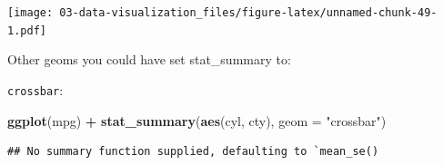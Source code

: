 \documentclass[]{book}
\newenvironment{Shaded}{\begin{snugshade}}{\end{snugshade}}
\newcommand{\DataTypeTok}[1]{\textcolor[rgb]{0.13,0.29,0.53}{#1}}
\newcommand{\DecValTok}[1]{\textcolor[rgb]{0.00,0.00,0.81}{#1}}
\newcommand{\FloatTok}[1]{\textcolor[rgb]{0.00,0.00,0.81}{#1}}
\newcommand{\KeywordTok}[1]{\textcolor[rgb]{0.13,0.29,0.53}{\textbf{#1}}}
\newcommand{\NormalTok}[1]{#1}
\newcommand{\OperatorTok}[1]{\textcolor[rgb]{0.81,0.36,0.00}{\textbf{#1}}}
\newcommand{\StringTok}[1]{\textcolor[rgb]{0.31,0.60,0.02}{#1}}
\theoremstyle{definition}
\theoremstyle{definition}
\theoremstyle{definition}
\theoremstyle{remark}
\begin{document}
\begin{Shaded}
\end{Shaded}

\texttt{[image: 03-data-visualization\_files/figure-latex/unnamed-chunk-49-1.pdf]}

Other geoms you could have set stat\_summary to:

\texttt{crossbar}:

\begin{Shaded}
\begin{Highlighting}[]
\KeywordTok{ggplot}\NormalTok{(mpg) }\OperatorTok{+}
\StringTok{  }\KeywordTok{stat_summary}\NormalTok{(}\KeywordTok{aes}\NormalTok{(cyl, cty), }\DataTypeTok{geom =} \StringTok{"crossbar"}\NormalTok{)}
\end{Highlighting}
\end{Shaded}

\begin{verbatim}
## No summary function supplied, defaulting to `mean_se()
\end{verbatim}
\end{document}
